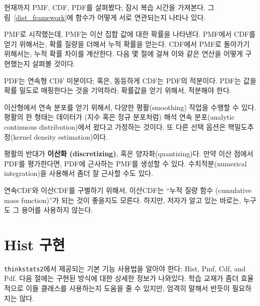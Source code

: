 현재까지 PMF, CDF, PDF를 살펴봤다; 잠시 복습 시간을 가져본다.
그림~\ref{dist_framework}에 함수가 어떻게 서로 연관되는지 나타나 있다.

PMF로 시작했는데, PMF는 이산 집합 값에 대한 확률을 나타낸다.
PMF에서 CDF를 얻기 위해서는, 확률 질량을 더해서 누적 확률을 얻는다.
CDF에서 PMF로 돌아가기 위해서는, 누적 확률 차이를 계산한다.
다음 몇 절에 걸쳐 이와 같은 연산을 어떻게 구현했는지 살펴볼 것이다.

PDF는 연속형 CDF 미분이다; 혹은, 동등하게 CDF는 PDF의 적분이다.
PDF는 값을 확률 밀도로 매핑한다는 것을 기억하라; 확률값을 얻기 위해서,
적분해야 한다.


이산형에서 연속 분포를 얻기 위해서, 다양한 평활(smoothing) 작업을 수행할 수 있다.
평활의 한 형태는 데이터가 (지수 혹은 정규 분포처럼) 
해석 연속 분포(analytic continuous distribution)에서 왔다고 가정하는 것이다.
또 다른 선택 옵션은 핵밀도추정(kernel density estimation)이다.


평활의 반대가 {\bf 이산화 (discretizing)}, 혹은 양자화(quantizing)다.
만약 이산 점에서 PDF를 평가한다면, PDF에 근사하는 PMF를 생성할 수 있다.
수치적분(numerical integration)을 사용해서 좀더 잘 근사할 수도 있다.

연속CDF와 이산CDF를 구별하기 위해서, 이산CDF는 
``누적 질량 함수 (cumulative mass function)''가 되는 것이 좋을지도 모른다.
하지만, 저자가 알고 있는 바로는, 누구도 그 용어를 사용하지 않는다.

\section{Hist 구현}

{\tt thinkstats2}에서 제공되는 기본 기능 사용법을 알아야 한다: Hist, Pmf, Cdf, and Pdf.
다음 절에는 구현된 방식에 대한 상세한 정보가 나와있다.
학습 교재가 좀더 효율적으로 이들 클래스를 사용하는지 도움을 줄 수 있지만,
엄격히 말해서 반듯이 필요하지는 않다.

